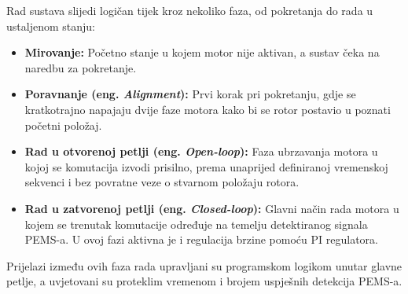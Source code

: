 \documentclass[diplomskirad]{fer}
\begin{document}
Rad sustava slijedi logičan tijek kroz nekoliko faza, od pokretanja do rada u
ustaljenom stanju:
\begin{itemize}
	\item \textbf{Mirovanje:} Početno stanje u kojem motor nije aktivan, a sustav čeka na naredbu za pokretanje.
	\item \textbf{Poravnanje (eng. \textit{Alignment}):} Prvi korak pri pokretanju, gdje se kratkotrajno napajaju dvije faze motora kako bi se rotor postavio u poznati početni položaj.
	\item \textbf{Rad u otvorenoj petlji (eng. \textit{Open-loop}):} Faza ubrzavanja motora u kojoj se komutacija izvodi prisilno, prema unaprijed definiranoj vremenskoj sekvenci i bez povratne veze o stvarnom položaju rotora.
	\item \textbf{Rad u zatvorenoj petlji (eng. \textit{Closed-loop}):} Glavni način rada motora u kojem se trenutak komutacije određuje na temelju detektiranog signala PEMS-a. U ovoj fazi aktivna je i regulacija brzine pomoću PI regulatora.
\end{itemize}
Prijelazi između ovih faza rada upravljani su programskom logikom unutar glavne petlje, a uvjetovani su proteklim vremenom i brojem uspješnih detekcija PEMS-a.
\end{document}
